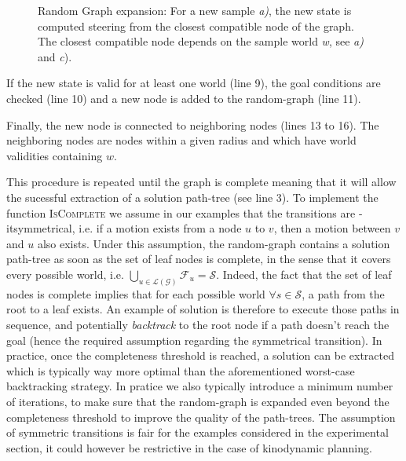 \documentclass[letterpaper, 10 pt, conference]{ieeeconf}  %
\begin{document}
\begin{figure}[!htb]
 \caption{Random Graph expansion: For a new sample \textit{a)}, the new state is computed steering from the closest compatible node of the graph. The closest compatible node depends on the sample world \textit{w}, see \textit{a)} and \textit{c}).}
 \label{fig:expansion}
\end{figure}
If the new state is valid for at least one world (line 9), the goal conditions are checked (line 10) and a new node is added to the random-graph (line 11).

Finally, the new node is connected to neighboring nodes (lines 13 to 16). The neighboring nodes are nodes within a given radius and which have world validities containing $w$.

This procedure is repeated until the graph is complete meaning that it will allow the sucessful extraction of a solution path-tree (see line 3). To implement the function \textsc{IsComplete} we assume in our examples that the transitions are \text-it{symmetrical}, i.e. if a motion exists from a node $u$ to $v$, then a motion between $v$ and $u$ also exists. Under this assumption, the random-graph contains a solution path-tree as soon as the set of leaf nodes is complete, in the sense that it covers every possible world, i.e.  $\bigcup_{u \in \mathcal{\mathcal{L}(G)}} \mathcal{F}_u = \mathcal{S}$. Indeed, the fact that the set of leaf nodes is complete implies that for each possible world $\forall s \in \mathcal{S}$, a path from the root to a leaf exists. An example of solution is therefore to execute those paths in sequence, and  potentially \textit{backtrack} to the root node if a path doesn't reach the goal (hence the required assumption regarding the symmetrical transition). In practice, once the completeness threshold is reached, a solution can be extracted which is typically way more optimal than the aforementioned worst-case backtracking strategy. In pratice we also typically introduce a minimum number of iterations, to make sure that the random-graph is expanded even beyond the completeness threshold to improve the quality of the path-trees. The assumption of symmetric transitions is fair for the examples considered in the experimental section, it could however be restrictive in the case of kinodynamic planning. %
\end{document}
